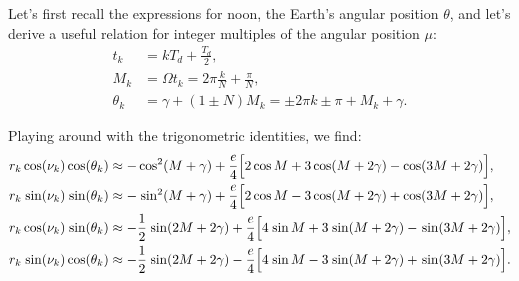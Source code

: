 \documentclass[12pt]{article}
\newcommand{\Sin}{%
  \mathop{\sbox0{$\cos$}\makebox[\wd0][r]{$\sin$}}%
}
\newcommand{\SinQ}{%
  \mathop{\sbox0{$\cos^2$}\makebox[\wd0][r]{$\sin^2$}}%
}
\begin{document}
Let's first recall the expressions for noon, the Earth's angular position 
$\theta$, and let's derive a useful relation for integer multiples of the 
angular position $\mu$:
\begin{align}
    t_k &= k T_d + \tfrac{T_d}{2},\\
    M_k &= \Omega t_k = 2\pi \tfrac{k}{N} + \tfrac{\pi}{N},\\
    \theta_k &= \gamma + (1\pm N)M_k = \pm 2\pi k \pm \pi + M_k + \gamma\label{eq:theta_ellipse}.
\end{align}

Playing around with the trigonometric identities, we find:
{\small
\begin{align}
    r_k \cos (\nu_k) \cos (\theta_k) &\approx 
        -\cos^2(M+\gamma)
        + \frac{e}{4} \Big[
            2\cos M + 3\cos(M+2\gamma) - \cos(3M+2\gamma)
        \Big],
        \label{eq:coscos}\\
    r_k \Sin (\nu_k) \Sin(\theta_k) &\approx 
        -\SinQ(M+\gamma)
        + \frac{e}{4} \Big[
            2\cos M - 3\cos(M+2\gamma) + \cos(3M+2\gamma)
        \Big],
        \label{eq:sinsin}\\
    r_k \cos (\nu_k) \Sin (\theta_k) &\approx 
        -\frac{1}{2}\Sin(2M+2\gamma)
        + \frac{e}{4} \Big[
            4\Sin M + 3\Sin(M+2\gamma) - \Sin(3M+2\gamma)
        \Big],
        \label{eq:cossin}\\
    r_k \Sin (\nu_k) \cos (\theta_k) &\approx 
        -\frac{1}{2}\Sin(2M+2\gamma)
        - \frac{e}{4} \Big[
            4\Sin M - 3\Sin(M+2\gamma) + \Sin(3M+2\gamma)
        \Big].
        \label{eq:sincos}
\end{align}
}
\end{document}
